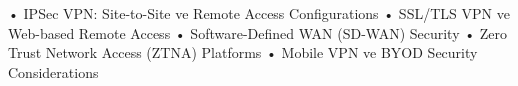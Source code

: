• IPSec VPN: Site-to-Site ve Remote Access Configurations
• SSL/TLS VPN ve Web-based Remote Access
• Software-Defined WAN (SD-WAN) Security
• Zero Trust Network Access (ZTNA) Platforms
• Mobile VPN ve BYOD Security Considerations